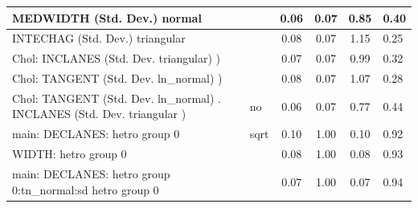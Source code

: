 \begin{table}
\begin{center}
\begin{tabular}{|l|l|c|c|c|l|}
			\hline
			MEDWIDTH (Std. Dev.) normal &  & 0.06 & 0.07 & 0.85 & 0.40 \\
			\hline
			INTECHAG (Std. Dev.) triangular &  & 0.08 & 0.07 & 1.15 & 0.25 \\
			\hline
			 Chol: INCLANES (Std. Dev. triangular) ) &  & 0.07 & 0.07 & 0.99 & 0.32 \\
			\hline
			 Chol: TANGENT (Std. Dev. ln_normal) ) &  & 0.08 & 0.07 & 1.07 & 0.28 \\
			\hline
			 Chol: TANGENT (Std. Dev. ln_normal) . INCLANES (Std. Dev.   triangular ) & no & 0.06 & 0.07 & 0.77 & 0.44 \\
			\hline
			main: DECLANES: hetro group 0 & sqrt & 0.10 & 1.00 & 0.10 & 0.92 \\
			\hline
			WIDTH: hetro group 0 &  & 0.08 & 1.00 & 0.08 & 0.93 \\
			\hline
			main: DECLANES: hetro group 0:tn_normal:sd  hetro group 0 &  & 0.07 & 1.00 & 0.07 & 0.94 \\
			\hline
		\end{tabular}
	\end{center}
\end{table}